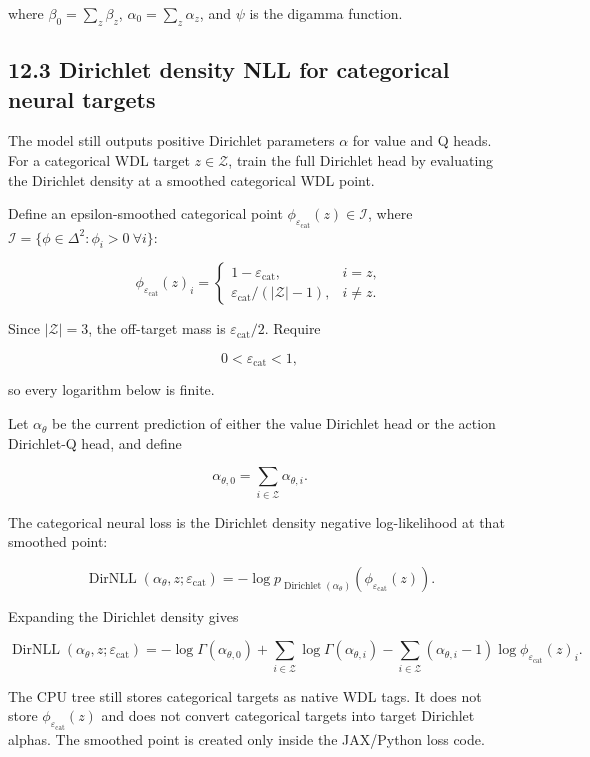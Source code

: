 \documentclass[11pt]{article}
\newcommand{\eps}{\varepsilon}
\newcommand{\Dir}{\operatorname{Dirichlet}}
\newcommand{\DirNLL}{\operatorname{DirNLL}}
\newcommand{\Z}{\mathcal{Z}}
\newcommand{\Interior}{\mathcal{I}}
\begin{document}
where \(\beta_0=\sum_z\beta_z\), \(\alpha_0=\sum_z\alpha_z\), and \(\psi\) is
the digamma function.

\subsection*{12.3 Dirichlet density NLL for categorical neural targets}

The model still outputs positive Dirichlet parameters \(\alpha\) for value and Q
heads. For a categorical WDL target \(z\in\Z\), train the full Dirichlet head by
evaluating the Dirichlet density at a smoothed categorical WDL point.

Define an epsilon-smoothed categorical point
\(\phi_{\eps_{\mathrm{cat}}}(z)\in\Interior\), where
\(\Interior=\{\phi\in\Delta^2: \phi_i>0\ \forall i\}\):

\[
\phi_{\eps_{\mathrm{cat}}}(z)_i=
\begin{cases}
1-\eps_{\mathrm{cat}},&i=z,\\[2pt]
\eps_{\mathrm{cat}}/(|\Z|-1),&i\ne z.
\end{cases}
\]

Since \(|\Z|=3\), the off-target mass is \(\eps_{\mathrm{cat}}/2\). Require

\[
0<\eps_{\mathrm{cat}}<1,
\]

so every logarithm below is finite.

Let \(\alpha_\theta\) be the current prediction of either the value Dirichlet
head or the action Dirichlet-Q head, and define

\[
\alpha_{\theta,0}=\sum_{i\in\Z}\alpha_{\theta,i}.
\]

The categorical neural loss is the Dirichlet density negative log-likelihood at
that smoothed point:

\[
\DirNLL(\alpha_\theta,z;\eps_{\mathrm{cat}})
=
-
\log p_{\Dir(\alpha_\theta)}
\left(
\phi_{\eps_{\mathrm{cat}}}(z)
\right).
\]

Expanding the Dirichlet density gives

\[
\DirNLL(\alpha_\theta,z;\eps_{\mathrm{cat}})
=
-
\log\Gamma(\alpha_{\theta,0})
+
\sum_{i\in\Z}\log\Gamma(\alpha_{\theta,i})
-
\sum_{i\in\Z}
(\alpha_{\theta,i}-1)
\log \phi_{\eps_{\mathrm{cat}}}(z)_i.
\]

The CPU tree still stores categorical targets as native WDL tags. It does not
store \(\phi_{\eps_{\mathrm{cat}}}(z)\) and does not convert categorical targets
into target Dirichlet alphas. The smoothed point is created only inside the
JAX/Python loss code.
\end{document}
